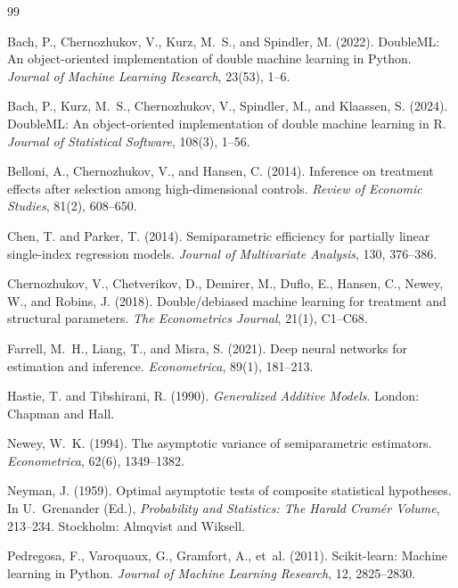 \documentclass[11pt,a4paper]{article}
\begin{document}
\begin{thebibliography}{99}\setlength{\itemsep}{2pt}

 Bach, P., Chernozhukov, V., Kurz, M.~S., and Spindler, M. (2022). DoubleML: An object-oriented implementation of double machine learning in Python. \emph{Journal of Machine Learning Research}, 23(53), 1--6.

 Bach, P., Kurz, M.~S., Chernozhukov, V., Spindler, M., and Klaassen, S. (2024). DoubleML: An object-oriented implementation of double machine learning in R. \emph{Journal of Statistical Software}, 108(3), 1--56.

 Belloni, A., Chernozhukov, V., and Hansen, C. (2014). Inference on treatment effects after selection among high-dimensional controls. \emph{Review of Economic Studies}, 81(2), 608--650.

 Chen, T. and Parker, T. (2014). Semiparametric efficiency for partially linear single-index regression models. \emph{Journal of Multivariate Analysis}, 130, 376--386.

 Chernozhukov, V., Chetverikov, D., Demirer, M., Duflo, E., Hansen, C., Newey, W., and Robins, J. (2018). Double/debiased machine learning for treatment and structural parameters. \emph{The Econometrics Journal}, 21(1), C1--C68.

 Farrell, M.~H., Liang, T., and Misra, S. (2021). Deep neural networks for estimation and inference. \emph{Econometrica}, 89(1), 181--213.

 Hastie, T. and Tibshirani, R. (1990). \emph{Generalized Additive Models}. London: Chapman and Hall.

 Newey, W.~K. (1994). The asymptotic variance of semiparametric estimators. \emph{Econometrica}, 62(6), 1349--1382.

 Neyman, J. (1959). Optimal asymptotic tests of composite statistical hypotheses. In U.~Grenander (Ed.), \emph{Probability and Statistics: The Harald Cram\'er Volume}, 213--234. Stockholm: Almqvist and Wiksell.

 Pedregosa, F., Varoquaux, G., Gramfort, A., et~al. (2011). Scikit-learn: Machine learning in Python. \emph{Journal of Machine Learning Research}, 12, 2825--2830.


\end{thebibliography}
\end{document}

